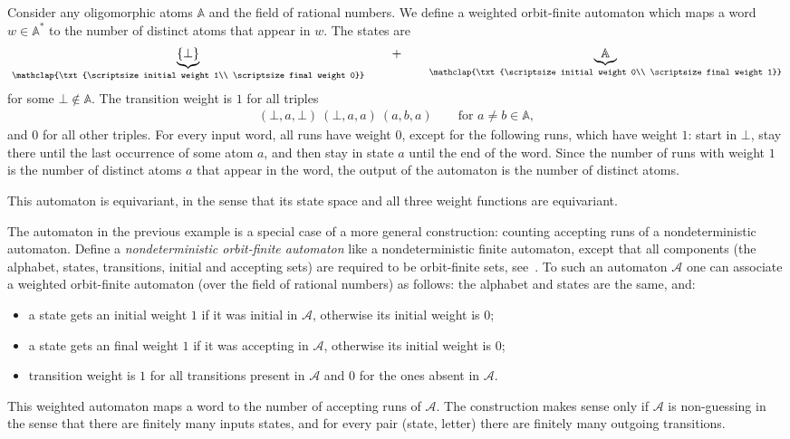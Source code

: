 \documentclass{theoretics}
\newcommand{\set}[1]{\{#1\}}
\newcommand{\Aa}{{\mathcal A}}
\newcommand{\myunderbrace}[2]{\underbrace{#1}_{\mathclap{\txt{\scriptsize #2}}}}
\newcommand{\atoms}{\mathbb A}
\begin{document}
\begin{example}\label{ex:count-letters} Consider any oligomorphic atoms $\atoms$ and the field of rational numbers. We define a weighted orbit-finite automaton  which maps a word $w \in \atoms^*$ to the number of distinct atoms that appear in $w$. The states are
    \newcommand*{\theinitialstate}{\bot}
    \begin{align*}
      \myunderbrace{\set{ \theinitialstate }}{initial weight 1\\
    \scriptsize final weight 0} \qquad  + \qquad   \myunderbrace{\atoms}{initial weight 0\\
    \scriptsize final weight 1}
    \end{align*}
     for some $\bot\not\in\atoms$. The transition weight is $1$ for all triples
    \begin{align*}
    (\theinitialstate, a, \theinitialstate) \  (\theinitialstate, a, a) \ (a, b, a) \qquad \text{for } a \neq b \in \atoms,
    \end{align*}
    and $0$ for all other triples. 
    For every input word, all runs have weight $0$, except for the following runs, which have weight $1$: start in $\theinitialstate$, stay there until  the last occurrence of some atom $a$, and then stay in state $a$ until the end of the word. Since the number of runs with weight $1$ is the number of distinct atoms $a$ that appear in the word, the output of the automaton is the number of distinct atoms. 
    
This automaton is equivariant, in the sense that its state space and all three weight functions are equivariant.      
\end{example}

\begin{example} \label{ex:count-runs} The automaton in the previous example is a special case of a more general construction: counting accepting runs of a nondeterministic automaton. 
    Define a \emph{nondeterministic orbit-finite automaton} like a nondeterministic finite automaton, except that all components (the alphabet, states, transitions, initial and accepting sets) are required to be orbit-finite sets, see~\cite[Def.~5.7]{bojanczyk_slightly2018}. To such an automaton $\Aa$ one can associate a weighted orbit-finite automaton (over the field of rational numbers) as follows: the alphabet and states are the same, and:
\begin{itemize}
\item a state gets an initial weight $1$ if it was initial in $\Aa$, otherwise its initial weight is $0$;
\item a state gets an final weight $1$ if it was accepting in $\Aa$, otherwise its initial weight is $0$;
\item transition weight is $1$ for all transitions present in $\Aa$ and $0$ for the ones absent in $\Aa$.
\end{itemize}
This  weighted automaton maps a word to the number of accepting runs of $\Aa$. The construction makes sense only if $\Aa$ is non-guessing in the sense that there are finitely many inputs states, and for every pair (state, letter) there are finitely many outgoing transitions. 
\end{example}
\end{document}
